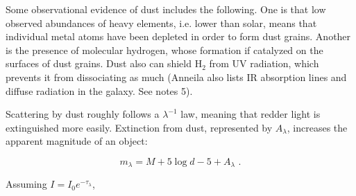 Some observational evidence of dust includes the following. One is that low observed abundances of heavy elements, i.e. lower than solar, means that individual metal atoms have been depleted in order to form dust grains. Another is the presence of molecular hydrogen, whose formation if catalyzed on the surfaces of dust grains. Dust also can shield H$_2$ from UV radiation, which prevents it from dissociating as much (Anneila also lists IR absorption lines and diffuse radiation in the galaxy. See notes 5).

Scattering by dust roughly follows a $\lambda^{-1}$ law, meaning that redder light is extinguished more easily. Extinction from dust, represented by $A_\lambda$, increases the apparent magnitude of an object:

\begin{equation}
m_\lambda = M + 5 \log d - 5 + A_\lambda \,\, .
\end{equation}

Assuming $I = I_0 e^{-\tau_\lambda}$,

